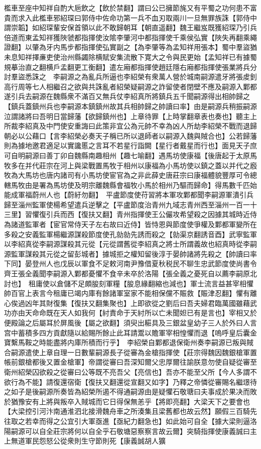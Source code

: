 檻車至座中知祥自酌大巵飲之【飲於禁翻】謂曰公已擁節旄又有平蜀之功何患不富貴而求入此檻車邪紹琛曰郭侍中佐命功第一兵不血刃取兩川一旦無罪族誅【郭侍中謂崇韜】如紹琛輩安保首領以此不敢歸朝耳【朝直遥翻】魏王繼岌既獲紹琛乃引兵倍道而東孟知祥獲陜虢都指揮使汝隂李肇河中都指揮使千乘侯弘實【陜失再翻乘繩證翻】以肇為牙内馬步都指揮使弘實副之【為李肇等為孟知祥用張本】蜀中羣盜猶未息知祥擇亷吏使治州縣蠲除横賦安集流散下寛大之令與民更始【孟知祥已有據蜀規摹治直之翻横戶孟翻更工衡翻】遣左廂都指揮使趙廷隱右廂都指揮使張業將兵分討羣盜悉誅之　李嗣源之為亂兵所逼也李紹榮有衆萬人營於城南嗣源遣牙將張䖍釗高行周等七人相繼召之欲與共誅亂者紹榮疑嗣源之詐留使者閉壁不應及嗣源入鄴都遂引兵去嗣源在魏縣衆不滿百又無兵仗李紹真所將鎮兵五千聞嗣源得出相帥歸之【鎮兵蓋鎮州兵也李嗣源本鎮鎮州故其兵相帥歸之帥讀曰率】由是嗣源兵稍振嗣源泣謂諸將曰吾明日當歸藩【欲歸鎮州也】上章待罪【上時掌翻章表也奏也】聽主上所裁李紹真及中門使安重誨曰此策非宜公為元帥不幸為凶人所劫李紹榮不戰而退歸朝必以公藉口【言李紹榮必奏天子稱已所以退師者以嗣源入魏與賊合也】公若歸藩則為據地邀君適足以實讒慝之言耳不若星行詣闕【星行者戴星而行也】面見天子庶可自明嗣源曰善丁卯自魏縣南趣相州【趣七喻翻】遇馬坊使康福【後唐起于太原馬牧多在并代莊宗在河上與梁戰置馬牧于相州以康福為小馬坊使以鎮之蓋以并代之廏牧為大馬坊也唐内諸司有小馬坊使宦官為之非此薛史唐莊宗曰康福體貌豐厚可令總轄馬牧由是署為馬坊使及明宗離魏縣會福牧小馬於相州乃驅而歸命】得馬數千匹始能成軍福蔚州人也【蔚紆勿翻】　平盧節度使苻習將本軍攻鄴都聞李嗣源軍潰引兵歸至淄州監軍使楊希望遣兵逆擊之【平盧節度治青州九域志青州西至淄州一百一十三里】習懼復引兵而西【復扶又翻】青州指揮使王公儼攻希望殺之因據其城時近侍為諸道監軍者【宦官常侍天子左右故曰近侍】皆恃恩與節度使爭權及鄴都軍變所在多殺之安義監軍楊繼源謀殺節度使孔勍勍先誘而殺之【勍渠京翻誘音酉】武寧監軍以李紹真從李嗣源謀殺其元從【元從謂舊從李紹真之將士所謂義故也紹真時從李嗣源監軍謀殺其元從之留彭城者】據城拒之權知留後淳于晏帥諸將先殺之【帥讀曰率下同】晏登州人也戊辰以軍食不足敕河南尹豫借夏秋税民不聊生忠武節度使尚書令齊王張全義聞李嗣源入鄴都憂懼不食辛未卒於洛陽【張全義之憂死自以薦李嗣原北討也】　租庸使以倉儲不足頗朘刻軍糧【朘息緣翻縮也減也】軍士流言益甚宰相懼帥百官上表言今租庸已竭内庫有餘諸軍室家不能相保儻不賑救【賑津忍翻】懼有離心俟過凶年其財復集【復扶又翻集聚也】上即欲從之劉后曰吾夫婦君臨萬國雖藉武功亦由天命命既在天人如我何【紂責命于天紂所以亡未聞妲已有是言也】宰相又於便殿論之后屬耳於屏風後【屬之欲翻】須臾出糚具及三銀盆皇幼子三人於外曰人言宫中蓄積多四方貢獻隨以給賜所餘止此耳請鬻以贍軍宰相惶懼而退【嗚呼皇后囊金寶繫馬鞍之時能盡將内庫所積而行乎】　李紹榮自鄴都退保衛州奏李嗣源已叛與賊合嗣源遣使上章自理一日數輩嗣源長子從審為金槍指揮使【莊宗得魏因魏銀槍軍置帳前銀槍都後又置金槍軍】帝謂從審曰吾深知爾父忠厚爾往諭朕意勿使自疑從審至衛州紹榮囚欲殺之從審曰公等既不亮吾父【亮信也】吾亦不能至父所【今人多謂不欲行為不能】請復還宿衛【復扶又翻還從宣翻又如字】乃釋之帝憐從審賜名繼璟待之如子是後嗣源所奏皆為紹榮所遏不得通嗣源由是疑懼石敬瑭曰夫事成於果决而敗於猶豫安有上將與叛卒入賊城而它日得保無恙乎【將即亮翻】大梁天下之要會也【大梁控引河汴南通淮泗北接滑魏舟車之所湊集且梁舊都也故云然】願假三百騎先往取之若幸而得之公宜引大軍亟進【亟紀力翻急也】如此始可自全【據大梁則逼洛陽嗣源可以自全莊宗將何以自全乎石敬塘惡察察言故云爾】突騎指揮使康義誠曰主上無道軍民怨怒公從衆則生守節則死【康義誠胡人獷